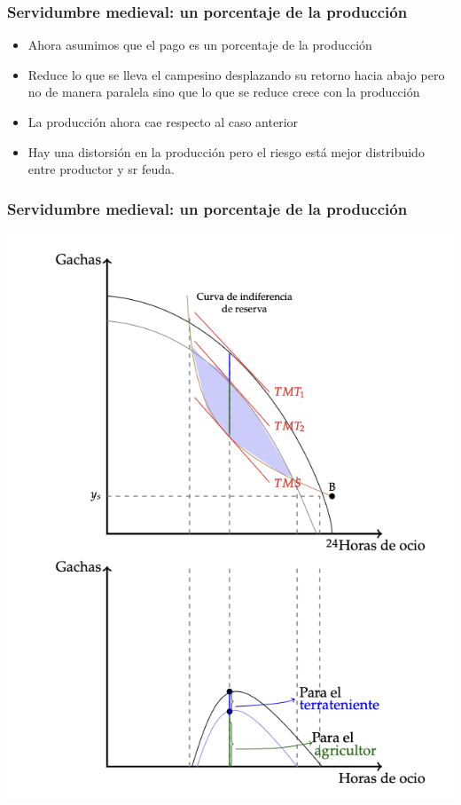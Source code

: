 \documentclass{beamer}
\begin{document}
\begin{frame}
\frametitle{Servidumbre medieval: un porcentaje de la producción }
\begin{itemize}
    \item Ahora asumimos que el pago es un porcentaje de la producción 
    \item Reduce lo que se lleva el campesino desplazando su retorno hacia abajo pero no de manera paralela sino que lo que se reduce crece con la producción
    \item La producción ahora cae respecto al caso anterior
     \item Hay una distorsión en la producción pero el riesgo está mejor distribuido entre productor y sr feuda. 
\end{itemize}
\end{frame}

\begin{frame}
\frametitle{Servidumbre medieval: un porcentaje de la producción}
\centering
\includegraphics[scale=0.6]{Slides Principios de Economia/gachas.png}
\end{frame}
\end{document}
